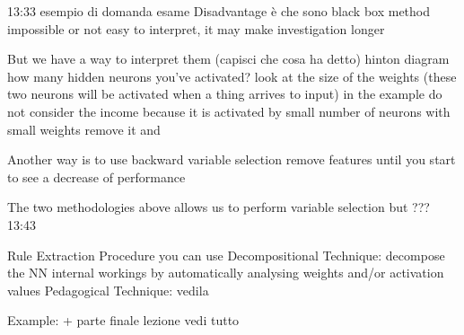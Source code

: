         13:33 esempio di domanda esame 
        Disadvantage è che sono black box method 
            impossible or not easy to interpret, it may make investigation longer 

            But we have a way to interpret them (capisci che cosa ha detto)
                hinton diagram 
                    how many hidden neurons you've activated?
                    look at the size of the weights (these two neurons will be activated when a thing arrives to input)
                    in the example do not consider the income because it is activated by small number of neurons with small weights
                    remove it and 

                Another way is to use backward variable selection 
                remove features until you start to see a decrease of performance 

                The two methodologies above allows us to perform variable selection 
                but ??? 13:43

            Rule Extraction Procedure 
                you can use 
                Decompositional Technique: decompose the NN internal workings by automatically analysing weights and/or activation values 
                Pedagogical Technique: vedila 

                Example:
                    + parte finale lezione vedi tutto 

                    




        








